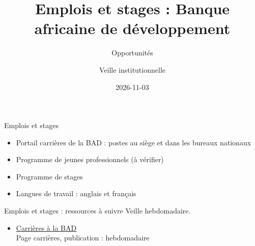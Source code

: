 \documentclass[aspectratio=169,11pt]{beamer}
\title{Emplois et stages : Banque africaine de développement}
\subtitle{Opportunités}
\author{Veille institutionnelle}
\date{2026-11-03}
\begin{document}
\begin{frame}\titlepage\end{frame}

\begin{frame}{Emplois et stages}
\begin{itemize}
\item Portail carrières de la BAD : postes au siège et dans les bureaux nationaux
\item Programme de jeunes professionnels (à vérifier)
\item Programme de stages
\item Langues de travail : anglais et français
\end{itemize}
\end{frame}

\begin{frame}{Emplois et stages : ressources à suivre}
\small
Veille hebdomadaire.
\begin{itemize}
\item \href{https://www.afdb.org/en/about-us/careers}{Carrières à la BAD}\\{\footnotesize Page carrières, publication : hebdomadaire}
\end{itemize}
\end{frame}
\end{document}
